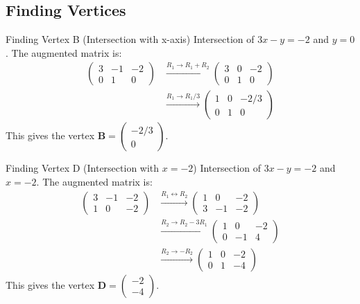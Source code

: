\documentclass{beamer}
\theoremstyle{remark}
\newcommand{\myvec}[1]{\ensuremath{\begin{pmatrix}#1\end{pmatrix}}}
\let\vec\mathbf
\numberwithin{equation}{section}
\begin{document}
\subsection{Finding Vertices}
\begin{frame}{Finding Vertex B (Intersection with x-axis)}
Intersection of $3x - y = -2$ and $y=0$. The augmented matrix is:
\begin{align*}
    \left(\begin{array}{cc|c} 3 & -1 & -2 \\ 0 & 1 & 0 \end{array}\right)
    &\xrightarrow{R_1 \to R_1 + R_2}
    \left(\begin{array}{cc|c} 3 & 0 & -2 \\ 0 & 1 & 0 \end{array}\right) \\
    &\xrightarrow{R_1 \to R_1/3}
    \left(\begin{array}{cc|c} 1 & 0 & -2/3 \\ 0 & 1 & 0 \end{array}\right)
\end{align*}
This gives the vertex $\vec{B} = \myvec{-2/3 \\ 0}$.
\end{frame}

\begin{frame}{Finding Vertex D (Intersection with $x=-2$)}
Intersection of $3x - y = -2$ and $x=-2$. The augmented matrix is:
\begin{align*}
    \left(\begin{array}{cc|c} 3 & -1 & -2 \\ 1 & 0 & -2 \end{array}\right)
    &\xrightarrow{R_1 \leftrightarrow R_2}
    \left(\begin{array}{cc|c} 1 & 0 & -2 \\ 3 & -1 & -2 \end{array}\right) \\
    &\xrightarrow{R_2 \to R_2 - 3R_1}
    \left(\begin{array}{cc|c} 1 & 0 & -2 \\ 0 & -1 & 4 \end{array}\right) \\
    &\xrightarrow{R_2 \to -R_2}
    \left(\begin{array}{cc|c} 1 & 0 & -2 \\ 0 & 1 & -4 \end{array}\right)
\end{align*}
This gives the vertex $\vec{D} = \myvec{-2 \\ -4}$.
\end{frame}
\end{document}
